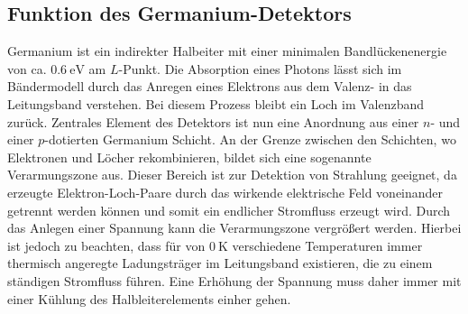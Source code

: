 \subsection{Funktion des Germanium-Detektors}
Germanium ist ein indirekter Halbeiter mit einer minimalen Bandlückenenergie von ca. $\SI{0.6}{\electronvolt}$ am $L$-Punkt.
Die Absorption eines Photons lässt sich im Bändermodell durch das Anregen eines Elektrons aus dem Valenz- in das
Leitungsband verstehen. Bei diesem Prozess bleibt ein Loch im Valenzband zurück. Zentrales Element des Detektors ist nun
eine Anordnung aus einer $n$- und einer $p$-dotierten Germanium Schicht. An der Grenze zwischen den Schichten, wo Elektronen
und Löcher rekombinieren, bildet sich eine sogenannte Verarmungszone aus. Dieser Bereich ist zur Detektion von Strahlung
geeignet, da erzeugte Elektron-Loch-Paare durch das wirkende elektrische Feld voneinander getrennt werden können und somit ein
endlicher Stromfluss erzeugt wird. Durch das Anlegen einer Spannung kann die Verarmungszone vergrößert werden. Hierbei ist jedoch
zu beachten, dass für von $\SI{0}{\kelvin}$ verschiedene Temperaturen immer thermisch angeregte Ladungsträger im Leitungsband existieren, die
zu einem ständigen Stromfluss führen. Eine Erhöhung der Spannung muss daher immer mit einer Kühlung des
Halbleiterelements einher gehen.

